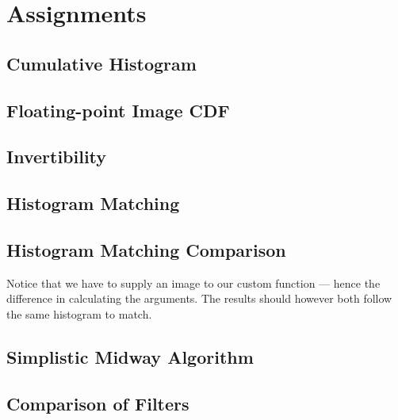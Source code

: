 %
%


\section{Assignments}

\subsection{Cumulative Histogram}
\label{appendix:1-3}

\subsection{Floating-point Image CDF}
\label{appendix:1-4}

\subsection{Invertibility}
\label{appendix:1-5}

\subsection{Histogram Matching}
\label{appendix:1-6}

\subsection{Histogram Matching Comparison}
\label{appendix:1-7}
Notice that we have to supply an image to our custom 
function --- hence the difference in calculating the arguments. The results
should however both follow the same histogram to match.

\subsection{Simplistic Midway Algorithm}
\label{appendix:1-9}

\subsection{Comparison of Filters}
\label{appendix:2-3}

